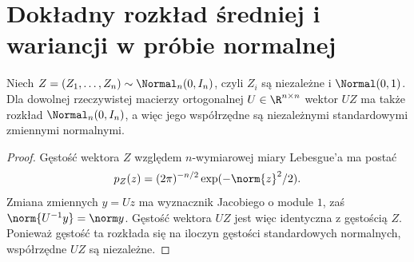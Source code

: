 \section{Dokładny rozkład średniej i wariancji w próbie normalnej}
\begin{lemat}\label{lem:gauss-rotation}
Niech $Z=(Z_1,\ldots,Z_n)\sim\Normal_n(0,I_n)$, czyli $Z_i$ są niezależne i $\Normal(0,1)$. Dla dowolnej rzeczywistej macierzy ortogonalnej $U\in\R^{n\times n}$ wektor $UZ$ ma także rozkład $\Normal_n(0,I_n)$, a więc jego współrzędne są niezależnymi standardowymi zmiennymi normalnymi.
\end{lemat}
\begin{proof}
Gęstość wektora $Z$ względem $n$-wymiarowej miary Lebesgue'a ma postać
\[
 p_Z(z)=(2\pi)^{-n/2}\exp(-\norm{z}^2/2).
\]
Zmiana zmiennych $y=Uz$ ma wyznacznik Jacobiego o module $1$, zaś $\norm{U^{-1}y}=\norm y$. Gęstość wektora $UZ$ jest więc identyczna z gęstością $Z$. Ponieważ gęstość ta rozkłada się na iloczyn gęstości standardowych normalnych, współrzędne $UZ$ są niezależne.
\end{proof}

